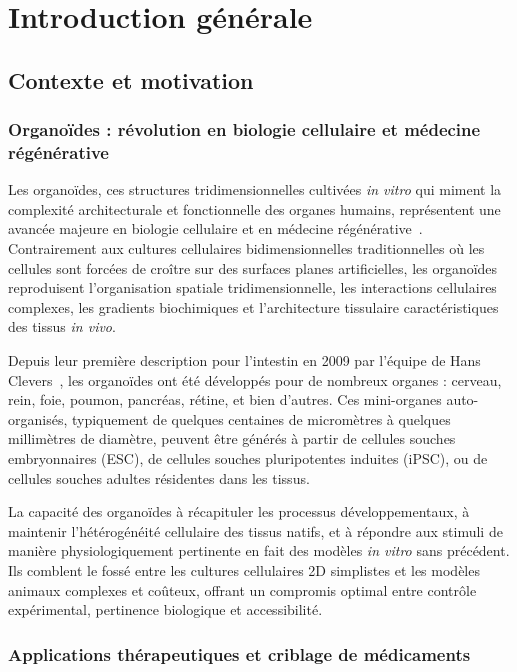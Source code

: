 
\chapter{Introduction générale}

\section{Contexte et motivation}

\subsection{Organoïdes : révolution en biologie cellulaire et médecine régénérative}

Les organoïdes, ces structures tridimensionnelles cultivées \textit{in vitro} qui miment la complexité architecturale et fonctionnelle des organes humains, représentent une avancée majeure en biologie cellulaire et en médecine régénérative~\cite{Zhao2022}. Contrairement aux cultures cellulaires bidimensionnelles traditionnelles où les cellules sont forcées de croître sur des surfaces planes artificielles, les organoïdes reproduisent l'organisation spatiale tridimensionnelle, les interactions cellulaires complexes, les gradients biochimiques et l'architecture tissulaire caractéristiques des tissus \textit{in vivo}.

Depuis leur première description pour l'intestin en 2009 par l'équipe de Hans Clevers~\cite{Sato2009}, les organoïdes ont été développés pour de nombreux organes : cerveau, rein, foie, poumon, pancréas, rétine, et bien d'autres. Ces mini-organes auto-organisés, typiquement de quelques centaines de micromètres à quelques millimètres de diamètre, peuvent être générés à partir de cellules souches embryonnaires (ESC), de cellules souches pluripotentes induites (iPSC), ou de cellules souches adultes résidentes dans les tissus.

La capacité des organoïdes à récapituler les processus développementaux, à maintenir l'hétérogénéité cellulaire des tissus natifs, et à répondre aux stimuli de manière physiologiquement pertinente en fait des modèles \textit{in vitro} sans précédent. Ils comblent le fossé entre les cultures cellulaires 2D simplistes et les modèles animaux complexes et coûteux, offrant un compromis optimal entre contrôle expérimental, pertinence biologique et accessibilité.

\subsection{Applications thérapeutiques et criblage de médicaments}

